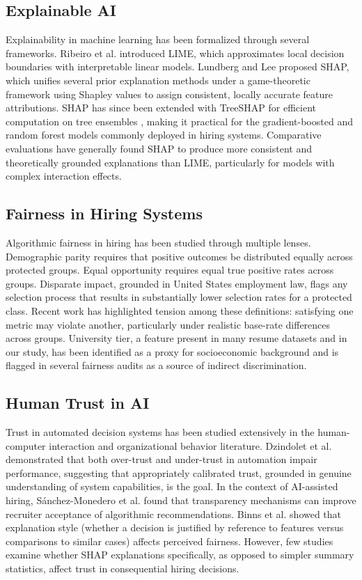\documentclass[conference]{IEEEtran}
\begin{document}
\subsection{Explainable AI}

Explainability in machine learning has been formalized through several frameworks. Ribeiro et al. \cite{ribeiro2016} introduced LIME, which approximates local decision boundaries with interpretable linear models. Lundberg and Lee \cite{lundberg2017} proposed SHAP, which unifies several prior explanation methods under a game-theoretic framework using Shapley values to assign consistent, locally accurate feature attributions. SHAP has since been extended with TreeSHAP for efficient computation on tree ensembles \cite{lundberg2020}, making it practical for the gradient-boosted and random forest models commonly deployed in hiring systems. Comparative evaluations have generally found SHAP to produce more consistent and theoretically grounded explanations than LIME, particularly for models with complex interaction effects.

\subsection{Fairness in Hiring Systems}

Algorithmic fairness in hiring has been studied through multiple lenses. Demographic parity requires that positive outcomes be distributed equally across protected groups. Equal opportunity \cite{hardt2016} requires equal true positive rates across groups. Disparate impact, grounded in United States employment law, flags any selection process that results in substantially lower selection rates for a protected class. Recent work has highlighted tension among these definitions: satisfying one metric may violate another, particularly under realistic base-rate differences across groups. University tier, a feature present in many resume datasets and in our study, has been identified as a proxy for socioeconomic background and is flagged in several fairness audits as a source of indirect discrimination.

\subsection{Human Trust in AI}

Trust in automated decision systems has been studied extensively in the human-computer interaction and organizational behavior literature. Dzindolet et al. \cite{dzindolet2003} demonstrated that both over-trust and under-trust in automation impair performance, suggesting that appropriately calibrated trust, grounded in genuine understanding of system capabilities, is the goal. In the context of AI-assisted hiring, S\'{a}nchez-Monedero et al. \cite{sanchez2020} found that transparency mechanisms can improve recruiter acceptance of algorithmic recommendations. Binns et al. \cite{binns2018} showed that explanation style (whether a decision is justified by reference to features versus comparisons to similar cases) affects perceived fairness. However, few studies examine whether SHAP explanations specifically, as opposed to simpler summary statistics, affect trust in consequential hiring decisions.
\end{document}
